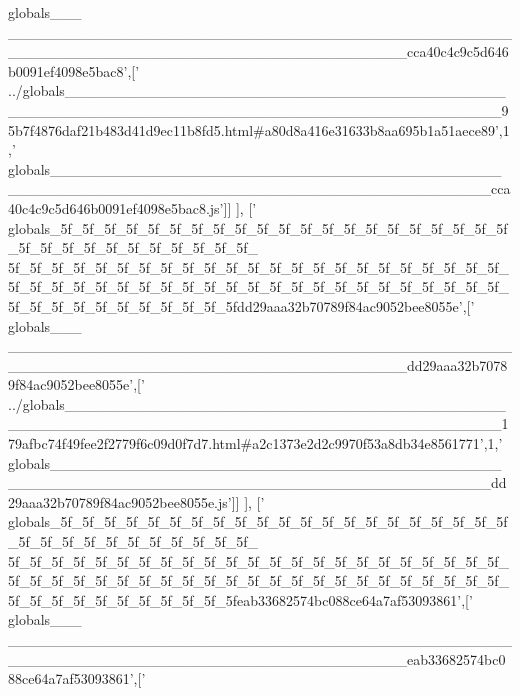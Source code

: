\begin{DoxyCode}
{      globals\_\_\_
      \_\_\_\_\_\_\_\_\_\_\_\_\_\_\_\_\_\_\_\_\_\_\_\_\_\_\_\_\_\_\_\_\_\_\_\_\_\_\_\_\_\_\_\_\_\_\_\_\_\_\_\_\_\_\_\_\_\_\_\_\_\_\_\_\_\_\_\_\_\_\_\_\_\_\_\_\_\_\_\_\_\_\_\_\_\_cca40c4c9c5d646b0091ef4098e5bac8'},[\textcolor{stringliteral}{'
      ../globals\_\_\_\_\_\_\_\_\_\_\_\_\_\_\_\_\_\_\_\_\_\_\_\_\_\_\_\_\_\_\_\_\_\_\_\_\_\_\_\_\_\_\_\_\_\_\_\_\_\_\_\_\_\_\_\_\_\_\_\_\_\_\_\_\_\_\_\_\_\_\_\_\_\_\_\_\_\_\_\_\_\_\_\_\_\_\_\_\_95b7f4876daf21b483d41d9ec11b8fd5.html#a80d8a416e31633b8aa695b1a51aece89'},1,\textcolor{stringliteral}{'
      globals\_\_\_\_\_\_\_\_\_\_\_\_\_\_\_\_\_\_\_\_\_\_\_\_\_\_\_\_\_\_\_\_\_\_\_\_\_\_\_\_\_\_\_\_\_\_\_\_\_\_\_\_\_\_\_\_\_\_\_\_\_\_\_\_\_\_\_\_\_\_\_\_\_\_\_\_\_\_\_\_\_\_\_\_\_\_\_\_\_cca40c4c9c5d646b0091ef4098e5bac8.js'}]]
      ],
  [\textcolor{stringliteral}{'
      globals\_5f\_5f\_5f\_5f\_5f\_5f\_5f\_5f\_5f\_5f\_5f\_5f\_5f\_5f\_5f\_5f\_5f\_5f\_5f\_5f\_5f\_5f\_5f\_5f\_5f\_5f\_5f\_5f\_5f\_5f\_5f\_5f\_
      5f\_5f\_5f\_5f\_5f\_5f\_5f\_5f\_5f\_5f\_5f\_5f\_5f\_5f\_5f\_5f\_5f\_5f\_5f\_5f\_5f\_5f\_5f\_5f\_5f\_5f\_5f\_5f\_5f\_5f\_5f\_5f\_5f\_5f\_5f\_5f\_5f\_5f\_5f\_5f\_5f\_5f\_5f\_5f\_5f\_5f\_5f\_5f\_5f\_5f\_5f\_5f\_5f\_5f\_5f\_5f\_5fdd29aaa32b70789f84ac9052bee8055e'},[\textcolor{stringliteral}{'
      globals\_\_\_
      \_\_\_\_\_\_\_\_\_\_\_\_\_\_\_\_\_\_\_\_\_\_\_\_\_\_\_\_\_\_\_\_\_\_\_\_\_\_\_\_\_\_\_\_\_\_\_\_\_\_\_\_\_\_\_\_\_\_\_\_\_\_\_\_\_\_\_\_\_\_\_\_\_\_\_\_\_\_\_\_\_\_\_\_\_\_dd29aaa32b70789f84ac9052bee8055e'},[\textcolor{stringliteral}{'
      ../globals\_\_\_\_\_\_\_\_\_\_\_\_\_\_\_\_\_\_\_\_\_\_\_\_\_\_\_\_\_\_\_\_\_\_\_\_\_\_\_\_\_\_\_\_\_\_\_\_\_\_\_\_\_\_\_\_\_\_\_\_\_\_\_\_\_\_\_\_\_\_\_\_\_\_\_\_\_\_\_\_\_\_\_\_\_\_\_\_\_179afbc74f49fee2f2779f6c09d0f7d7.html#a2c1373e2d2c9970f53a8db34e8561771'},1,\textcolor{stringliteral}{'
      globals\_\_\_\_\_\_\_\_\_\_\_\_\_\_\_\_\_\_\_\_\_\_\_\_\_\_\_\_\_\_\_\_\_\_\_\_\_\_\_\_\_\_\_\_\_\_\_\_\_\_\_\_\_\_\_\_\_\_\_\_\_\_\_\_\_\_\_\_\_\_\_\_\_\_\_\_\_\_\_\_\_\_\_\_\_\_\_\_\_dd29aaa32b70789f84ac9052bee8055e.js'}]]
      ],
  [\textcolor{stringliteral}{'
      globals\_5f\_5f\_5f\_5f\_5f\_5f\_5f\_5f\_5f\_5f\_5f\_5f\_5f\_5f\_5f\_5f\_5f\_5f\_5f\_5f\_5f\_5f\_5f\_5f\_5f\_5f\_5f\_5f\_5f\_5f\_5f\_5f\_
      5f\_5f\_5f\_5f\_5f\_5f\_5f\_5f\_5f\_5f\_5f\_5f\_5f\_5f\_5f\_5f\_5f\_5f\_5f\_5f\_5f\_5f\_5f\_5f\_5f\_5f\_5f\_5f\_5f\_5f\_5f\_5f\_5f\_5f\_5f\_5f\_5f\_5f\_5f\_5f\_5f\_5f\_5f\_5f\_5f\_5f\_5f\_5f\_5f\_5f\_5f\_5f\_5f\_5f\_5f\_5f\_5feab33682574bc088ce64a7af53093861'},[\textcolor{stringliteral}{'
      globals\_\_\_
      \_\_\_\_\_\_\_\_\_\_\_\_\_\_\_\_\_\_\_\_\_\_\_\_\_\_\_\_\_\_\_\_\_\_\_\_\_\_\_\_\_\_\_\_\_\_\_\_\_\_\_\_\_\_\_\_\_\_\_\_\_\_\_\_\_\_\_\_\_\_\_\_\_\_\_\_\_\_\_\_\_\_\_\_\_\_eab33682574bc088ce64a7af53093861'},[\textcolor{stringliteral}{'
}
\end{DoxyCode}

